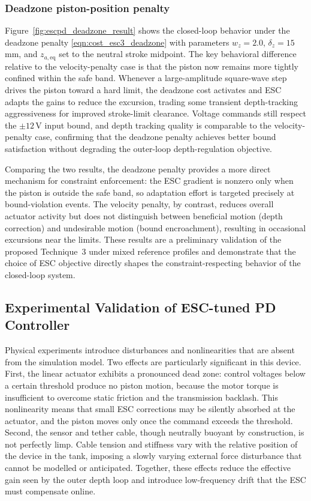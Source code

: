 ﻿\documentclass[subscriptcorrection,upint,varvw,barcolor=Goldenrod3,mathalfa=cal=euler,balance,hyphenate,french,pdf-a]{asmejour}
\begin{document}
\subsubsection{Deadzone piston-position penalty}
Figure~\ref{fig:escpd_deadzone_result} shows the closed-loop behavior under the deadzone penalty \eqref{eqn:cost_esc3_deadzone} with parameters $w_z = 2.0$, $\delta_z = 15$\,mm, and $z_{a,\mathrm{eq}}$ set to the neutral stroke midpoint.  The key behavioral difference relative to the velocity-penalty case is that the piston now remains more tightly confined within the safe band.  Whenever a large-amplitude square-wave step drives the piston toward a hard limit, the deadzone cost activates and ESC adapts the gains to reduce the excursion, trading some transient depth-tracking aggressiveness for improved stroke-limit clearance.  Voltage commands still respect the $\pm 12$\,V input bound, and depth tracking quality is comparable to the velocity-penalty case, confirming that the deadzone penalty achieves better bound satisfaction without degrading the outer-loop depth-regulation objective.

Comparing the two results, the deadzone penalty provides a more direct mechanism for constraint enforcement: the ESC gradient is nonzero only when the piston is outside the safe band, so adaptation effort is targeted precisely at bound-violation events.  The velocity penalty, by contrast, reduces overall actuator activity but does not distinguish between beneficial motion (depth correction) and undesirable motion (bound encroachment), resulting in occasional excursions near the limits.  These results are a preliminary validation of the proposed Technique~3 under mixed reference profiles and demonstrate that the choice of ESC objective directly shapes the constraint-respecting behavior of the closed-loop system.  

\subsection{Experimental Validation of ESC-tuned PD Controller}

Physical experiments introduce disturbances and nonlinearities that are absent from the simulation model. Two effects are particularly significant in this device. First, the linear actuator exhibits a pronounced dead zone: control voltages below a certain threshold produce no piston motion, because the motor torque is insufficient to overcome static friction and the transmission backlash. This nonlinearity means that small ESC corrections may be silently absorbed at the actuator, and the piston moves only once the command exceeds the threshold. Second, the sensor and tether cable, though neutrally buoyant by construction, is not perfectly limp. Cable tension and stiffness vary with the relative position of the device in the tank, imposing a slowly varying external force disturbance that cannot be modelled or anticipated. Together, these effects reduce the effective gain seen by the outer depth loop and introduce low-frequency drift that the ESC must compensate online.
\end{document}
